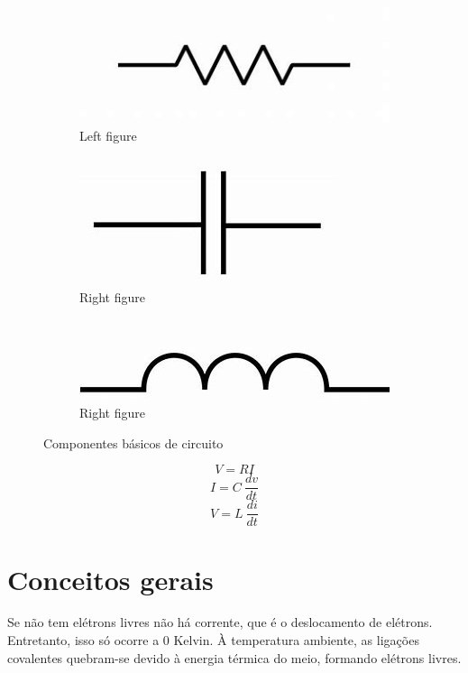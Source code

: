 \documentclass{PETeletrica}
\begin{document}
\begin{multicols}{2}
\begin{figure}[H]
\begin{subfigure}{0.32\columnwidth}
\centering
\includegraphics[width=\columnwidth]{resistor}
\caption{Left figure} \label{fig:left}
\end{subfigure}
\hfill
\begin{subfigure}{0.32\columnwidth}
\centering
\includegraphics[width=\columnwidth]{capacitor}
\caption{Right figure} \label{fig:right}
\end{subfigure}
\hfill
\begin{subfigure}{0.32\columnwidth}
\centering
\includegraphics[width=\columnwidth]{indutor}
\caption{Right figure} \label{fig:right}
\end{subfigure}
\caption{Componentes básicos de circuito}
\end{figure}

$$V=RI$$
$$I=C\ \dfrac{dv}{dt}$$
$$V=L\ \dfrac{di}{dt}$$

\section{Conceitos gerais}
Se não tem elétrons livres não há corrente, que é o deslocamento de elétrons. Entretanto, isso só ocorre a 0 Kelvin.
À temperatura ambiente, as ligações covalentes quebram-se devido à energia térmica do meio, formando elétrons livres.


\end{multicols}
\end{document}
